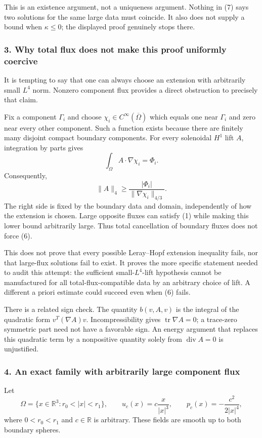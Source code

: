 \documentclass[11pt]{article}
\begin{document}
This is an existence argument, not a uniqueness argument. Nothing in (7) says two solutions for the same large data must coincide. It also does not supply a bound when $\kappa\leq0$; the displayed proof genuinely stops there.

\subsubsection{3. Why total flux does not make this proof uniformly coercive}
It is tempting to say that one can always choose an extension with arbitrarily small $L^4$ norm. Nonzero component flux provides a direct obstruction to precisely that claim.

Fix a component $\Gamma_i$ and choose $\chi_i\in C^\infty(\overline\Omega)$ which equals one near $\Gamma_i$ and zero near every other component. Such a function exists because there are finitely many disjoint compact boundary components. For every solenoidal $H^1$ lift $A$, integration by parts gives
\[
 \int_\Omega A\cdot\nabla\chi_i=\Phi_i.
\]
Consequently,
\[
 \|A\|_4\geq
 \frac{|\Phi_i|}{\|\nabla\chi_i\|_{4/3}}.                 \tag{11}
\]
The right side is fixed by the boundary data and domain, independently of how the extension is chosen. Large opposite fluxes can satisfy (1) while making this lower bound arbitrarily large. Thus total cancellation of boundary fluxes does not force (6).

This does not prove that every possible Leray--Hopf extension inequality fails, nor that large-flux solutions fail to exist. It proves the more specific statement needed to audit this attempt: the sufficient small-$L^4$-lift hypothesis cannot be manufactured for all total-flux-compatible data by an arbitrary choice of lift. A different a priori estimate could succeed even when (6) fails.

There is a related sign check. The quantity $b(v,A,v)$ is the integral of the quadratic form $v^T(\nabla A)v$. Incompressibility gives $\operatorname{tr}\nabla A=0$; a trace-zero symmetric part need not have a favorable sign. An energy argument that replaces this quadratic term by a nonpositive quantity solely from $\operatorname{div}A=0$ is unjustified.

\subsubsection{4. An exact family with arbitrarily large component flux}
Let
\[
 \Omega=\{x\in\mathbb R^3:r_0<|x|<r_1\},\qquad
 u_c(x)=c\frac{x}{|x|^3},\qquad
 p_c(x)=-\frac{c^2}{2|x|^4},                              \tag{12}
\]
where $0<r_0<r_1$ and $c\in\mathbb R$ is arbitrary. These fields are smooth up to both boundary spheres.
\end{document}
